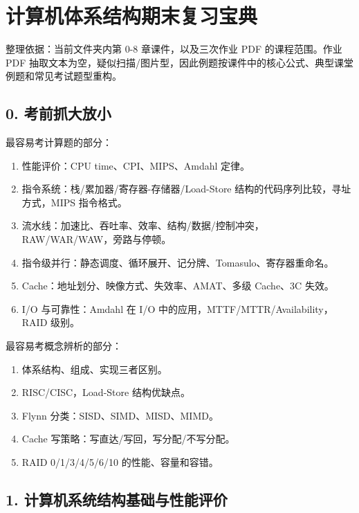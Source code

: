 \documentclass[
]{ctexart}
\author{}
\date{}
\providecommand{\tightlist}{%
  \setlength{\itemsep}{0pt}\setlength{\parskip}{0pt}}
\begin{document}
\section{计算机体系结构期末复习宝典}\label{ux8ba1ux7b97ux673aux4f53ux7cfbux7ed3ux6784ux671fux672bux590dux4e60ux5b9dux5178}

整理依据：当前文件夹内第 0-8 章课件，以及三次作业 PDF 的课程范围。作业
PDF
抽取文本为空，疑似扫描/图片型，因此例题按课件中的核心公式、典型课堂例题和常见考试题型重构。

\subsection{0. 考前抓大放小}\label{ux8003ux524dux6293ux5927ux653eux5c0f}

最容易考计算题的部分：

\begin{enumerate}
\def\labelenumi{\arabic{enumi}.}
\tightlist
\item
  性能评价：CPU time、CPI、MIPS、Amdahl 定律。
\item
  指令系统：栈/累加器/寄存器-存储器/Load-Store
  结构的代码序列比较，寻址方式，MIPS 指令格式。
\item
  流水线：加速比、吞吐率、效率、结构/数据/控制冲突，RAW/WAR/WAW，旁路与停顿。
\item
  指令级并行：静态调度、循环展开、记分牌、Tomasulo、寄存器重命名。
\item
  Cache：地址划分、映像方式、失效率、AMAT、多级 Cache、3C 失效。
\item
  I/O 与可靠性：Amdahl 在 I/O 中的应用，MTTF/MTTR/Availability，RAID
  级别。
\end{enumerate}

最容易考概念辨析的部分：

\begin{enumerate}
\def\labelenumi{\arabic{enumi}.}
\tightlist
\item
  体系结构、组成、实现三者区别。
\item
  RISC/CISC，Load-Store 结构优缺点。
\item
  Flynn 分类：SISD、SIMD、MISD、MIMD。
\item
  Cache 写策略：写直达/写回，写分配/不写分配。
\item
  RAID 0/1/3/4/5/6/10 的性能、容量和容错。
\end{enumerate}

\subsection{1.
计算机系统结构基础与性能评价}\label{ux8ba1ux7b97ux673aux7cfbux7edfux7ed3ux6784ux57faux7840ux4e0eux6027ux80fdux8bc4ux4ef7}
\end{document}
